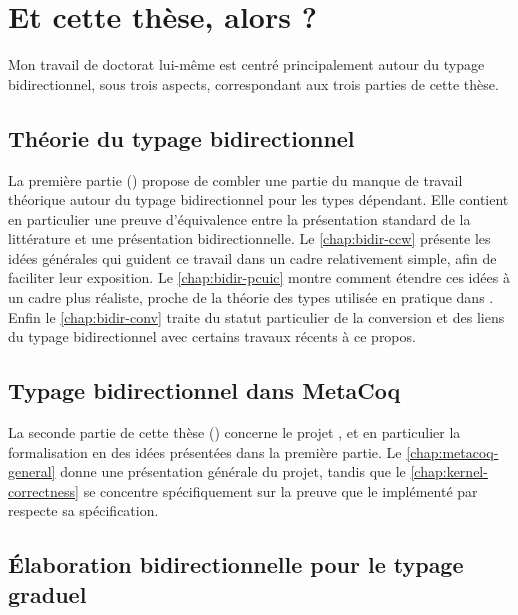 \section{Et cette thèse, alors ?}
\label{sec:cette-these}

Mon travail de doctorat lui-même
est centré principalement autour du typage bidirectionnel, sous
trois aspects, correspondant aux trois parties de cette thèse.

\subsection{Théorie du typage bidirectionnel}

La première partie () propose de combler une partie du
manque de travail théorique autour du typage bidirectionnel pour les types dépendant.
Elle contient en particulier une
preuve d’équivalence entre la présentation standard de la littérature
et une présentation bidirectionnelle.
Le \cref{chap:bidir-ccw} présente les idées générales qui guident ce travail
dans un cadre relativement simple, afin de faciliter leur exposition. 
Le \cref{chap:bidir-pcuic} montre comment étendre ces idées à un
cadre plus réaliste, proche de la théorie des types utilisée en pratique dans .
Enfin le \cref{chap:bidir-conv} traite du statut particulier de la
conversion
et des liens du typage bidirectionnel avec certains travaux récents
à ce propos.

\subsection{Typage bidirectionnel dans MetaCoq}

La seconde partie de cette thèse ()
concerne le projet ,
et en particulier la formalisation en  des idées présentées dans la
première partie. Le \cref{chap:metacoq-general} donne une présentation générale du
projet, tandis que le \cref{chap:kernel-correctness} se concentre spécifiquement
sur la preuve que le  implémenté par  respecte sa spécification.

\subsection{Élaboration bidirectionnelle pour le typage graduel}

